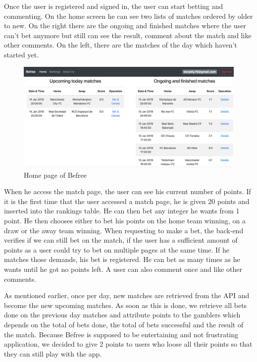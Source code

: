\documentclass[conference]{IEEEtran}
\begin{document}
Once the user is registered and signed in, the user can start betting and commenting. On the home screen he can see two lists of matches ordered by older to new. On the right there are the ongoing and finished matches where the user can't bet anymore but still can see the result, comment about the match and like other comments. On the left, there are the matches of the day which haven't started yet. 

\begin{figure}[htbp]
\centerline{\includegraphics[scale=0.2]{home_page.png}}
\caption{Home page of Befree}
\end{figure}

When he access the match page, the user can see his current number of points. If it is the first time that the user accessed a match page, he is given 20 points and inserted into the rankings table. He can then bet any integer he wants from 1 point. He then chooses either to bet his points on the home team winning, on a draw or the away team winning. When requesting to make a bet, the back-end verifies if we can still bet on the match, if the user has a sufficient amount of points as a user could try to bet on multiple pages at the same time. If he matches those demands, his bet is registered. He can bet as many times as he wants until he got no points left. A user can also comment once and like other comments.

As mentioned earlier, once per day, new matches are retrieved from the API and become the new upcoming matches. As soon as this is done, we retrieve all bets done on the previous day matches and attribute points to the gamblers which depends on the total of bets done, the total of bets successful and the result of the match. Because Befree is supposed to be entertaining and not frustrating application, we decided to give 2 points to users who loose all their points so that they can still play with the app.
\end{document}
